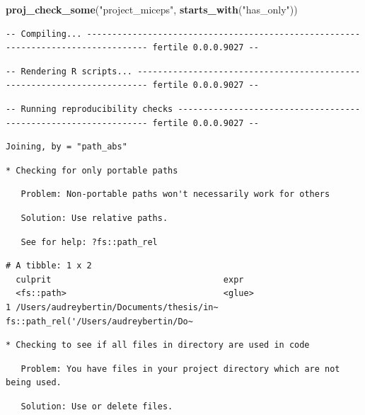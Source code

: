 \documentclass[12pt,twoside]{reedthesis}
\newenvironment{Shaded}{\begin{snugshade}}{\end{snugshade}}
\newcommand{\KeywordTok}[1]{\textcolor[rgb]{0.13,0.29,0.53}{\textbf{#1}}}
\newcommand{\StringTok}[1]{\textcolor[rgb]{0.31,0.60,0.02}{#1}}
\newcommand{\NormalTok}[1]{#1}
\begin{document}
\footnotesize
\begin{Shaded}
\begin{Highlighting}[]
\KeywordTok{proj_check_some}\NormalTok{(}\StringTok{"project_miceps"}\NormalTok{, }\KeywordTok{starts_with}\NormalTok{(}\StringTok{"has_only"}\NormalTok{))}
\end{Highlighting}
\end{Shaded}
\begin{verbatim}
-- Compiling... ---------------------------------------------------------------------------------- fertile 0.0.0.9027 --
\end{verbatim}
\begin{verbatim}
-- Rendering R scripts... ------------------------------------------------------------------------ fertile 0.0.0.9027 --
\end{verbatim}
\begin{verbatim}
-- Running reproducibility checks ---------------------------------------------------------------- fertile 0.0.0.9027 --
\end{verbatim}
\begin{verbatim}
Joining, by = "path_abs"
\end{verbatim}
\begin{verbatim}
* Checking for only portable paths
\end{verbatim}
\begin{verbatim}
   Problem: Non-portable paths won't necessarily work for others
\end{verbatim}
\begin{verbatim}
   Solution: Use relative paths.
\end{verbatim}
\begin{verbatim}
   See for help: ?fs::path_rel
\end{verbatim}
\begin{verbatim}
# A tibble: 1 x 2
  culprit                                  expr                                 
  <fs::path>                               <glue>                               
1 /Users/audreybertin/Documents/thesis/in~ fs::path_rel('/Users/audreybertin/Do~
\end{verbatim}
\begin{verbatim}
* Checking to see if all files in directory are used in code
\end{verbatim}
\begin{verbatim}
   Problem: You have files in your project directory which are not being used.
\end{verbatim}
\begin{verbatim}
   Solution: Use or delete files.
\end{verbatim}
\end{document}
